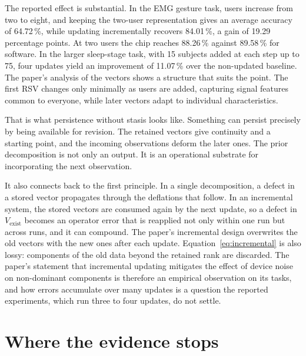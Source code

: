 \documentclass[11pt]{article}
\theoremstyle{definition}
\theoremstyle{remark}
\begin{document}
The reported effect is substantial. In the EMG gesture task, users increase from two to eight, and keeping the two-user representation gives an average accuracy of 64.72\,\%, while updating incrementally recovers 84.01\,\%, a gain of 19.29 percentage points. At two users the chip reaches 88.26\,\% against 89.58\,\% for software. In the larger sleep-stage task, with 15 subjects added at each step up to 75, four updates yield an improvement of 11.07\,\% over the non-updated baseline. The paper's analysis of the vectors shows a structure that suits the point. The first RSV changes only minimally as users are added, capturing signal features common to everyone, while later vectors adapt to individual characteristics.

That is what persistence without stasis looks like. Something can persist precisely by being available for revision. The retained vectors give continuity and a starting point, and the incoming observations deform the later ones. The prior decomposition is not only an output. It is an operational substrate for incorporating the next observation.

It also connects back to the first principle. In a single decomposition, a defect in a stored vector propagates through the deflations that follow. In an incremental system, the stored vectors are consumed again by the next update, so a defect in $V_{\mathrm{exist}}$ becomes an operator error that is reapplied not only within one run but across runs, and it can compound. The paper's incremental design overwrites the old vectors with the new ones after each update. Equation~\eqref{eq:incremental} is also lossy: components of the old data beyond the retained rank are discarded. The paper's statement that incremental updating mitigates the effect of device noise on non-dominant components is therefore an empirical observation on its tasks, and how errors accumulate over many updates is a question the reported experiments, which run three to four updates, do not settle.

\section{Where the evidence stops}
\end{document}
